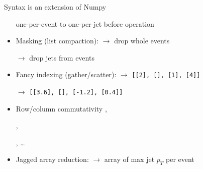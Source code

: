 \documentclass[aspectratio=169]{beamer}
\begin{document}
\begin{frame}{Syntax is an extension of Numpy}
\begin{onlyenv}
\begin{itemize}
\tabto{5.5 cm}one-per-event to one-per-jet before operation

\item Masking (list compaction):  $\to$ drop whole events

 $\to$ drop jets from events

\item Fancy indexing (gather/scatter):  $\to$ \mbox{\small \texttt{[[2], [], [1], [4]]}\hspace{-0.5 cm}}

 $\to$ \mbox{\small \texttt{[[3.6], [], [-1.2], [0.4]]}\hspace{-0.5 cm}}

\item Row/column commutativity ,

,

, \ldots

\item Jagged array reduction:  $\to$ array of max jet $p_T$ per event
\end{itemize}
\end{onlyenv}
\end{frame}
\end{document}
